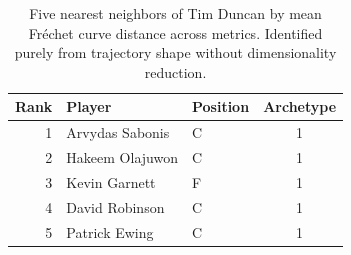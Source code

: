 \begin{table}[htbp]
  \centering\small
  \begin{tabular}{rllc}
    \toprule
    Rank & Player & Position & Archetype \\
    \midrule
    1 & Arvydas Sabonis & C & 1 \\
    2 & Hakeem Olajuwon & C & 1 \\
    3 & Kevin Garnett & F & 1 \\
    4 & David Robinson & C & 1 \\
    5 & Patrick Ewing & C & 1 \\
    \bottomrule
  \end{tabular}
  \caption{Five nearest neighbors of Tim Duncan by mean Fr\'{e}chet curve distance across metrics. Identified purely from trajectory shape without dimensionality reduction.}
  \label{tab:Tim_Duncan_frechet_curve_neighbors}
\end{table}

